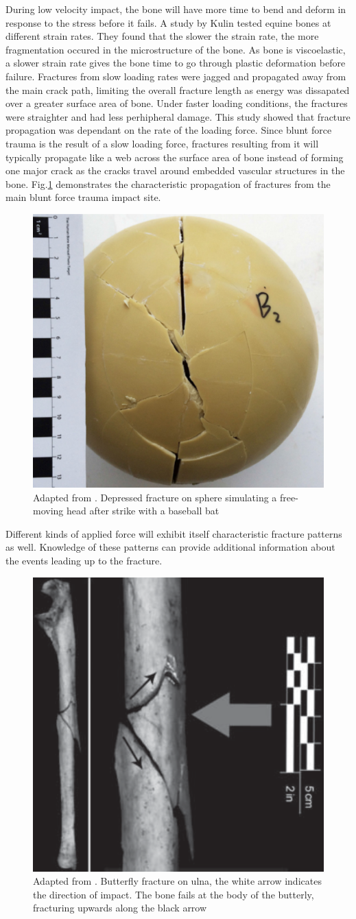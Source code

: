 \documentclass[titlepage]{article}
\begin{document}
During low velocity impact, the bone will have more time to bend and deform in response to the stress before it fails. A study by Kulin\cite{post-imaging} tested equine bones at different strain rates. They found that the slower the strain rate, the more fragmentation occured in the microstructure of the bone. As bone is viscoelastic, a slower strain rate gives the bone time to go through plastic deformation before failure. Fractures from slow loading rates were jagged and propagated away from the main crack path, limiting the overall fracture length as energy was dissapated over a greater surface area of bone. Under faster loading conditions, the fractures were straighter and had less perhipheral damage. This study showed that fracture propagation was dependant on the rate of the loading force. Since blunt force trauma is the result of a slow loading force, fractures resulting from it will typically propagate like a web across the surface area of bone instead of forming one major crack as the cracks travel around embedded vascular structures in the bone. Fig.\ref{fig:skull} demonstrates the characteristic propagation of fractures from the main blunt force trauma impact site.

\begin{figure}[h!]
\centering
\includegraphics[width=.4\linewidth]{blunt_trauma}
\caption{Adapted from \cite{craniums}. Depressed fracture on sphere simulating a free-moving head after strike with a baseball bat}
\label{fig:skull}
\end{figure}

Different kinds of applied force will exhibit itself characteristic fracture patterns as well. Knowledge of these patterns can provide additional information about the events leading up to the fracture.

\begin{figure}[h!]
\centering
\includegraphics[width=.4\linewidth]{butterfly}
\caption{Adapted from \cite{bft}. Butterfly fracture on ulna, the white arrow indicates the direction of impact. The bone fails at the body of the butterly, fracturing upwards along the black arrow}
\label{fig:butterfly-fracture}
\end{figure}
\end{document}
